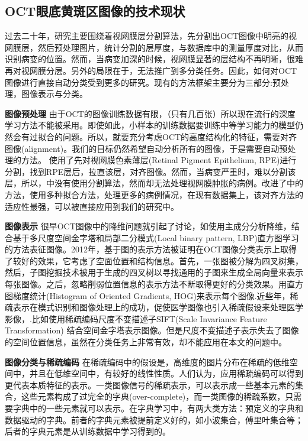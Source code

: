     \subsection{OCT眼底黄斑区图像的技术现状}
    过去二十年，研究主要围绕着视网膜层分割算法\cite{antony2013combined,savastano2014differential}，先分割出OCT图像中明亮的视网膜层，然后预处理图片，统计分割的层厚度，与数据库中的测量厚度对比，从而识别病变的位置。然而，当病变加深的时候，视网膜显著的层结构不再明晰，很难再对视网膜分层。另外的局限在于，无法推广到多分类任务。因此，如何对OCT图像进行直接自动分类受到更多的研究。现有的方法框架主要分为三部分:预处理，图像表示与分类。

    \textbf{图像预处理}
    由于OCT的图像训练数据有限，（只有几百张）所以现在流行的深度学习方法不能被采用。即使如此，小样本的训练数据要训练中等学习能力的模型仍然会有过拟合的问题。所以，就要充分考虑OCT的高度结构化的特征，需要对齐图像(alignment)。我们的目标仍然希望自动分析所有的图像，于是需要自动预处理的方法。 使用了先对视网膜色素薄层(Retinal Pigment Epithelium, RPE)进行分割，找到RPE层后，拉直该层，对齐图像。然而，当病变严重时，难以分割该层，所以，中没有使用分割算法，然而却无法处理视网膜肿胀的病例。改进了中的方法，使用多种拟合方法，处理更多的病例情况，在现有数据集上，该对齐方法的适应性最强，可以被直接应用到我们的研究中。

    \textbf{图像表示}
    很早OCT图像中的降维问题就引起了讨论，如使用主成分分析降维，结合基于多尺度空间金字塔和局部二分模式(Local binary pattern, LBP)直方图学习的方法表征图像。2012年，基于图的表示方法被证明在OCT图像分类表示上取得了较好的效果\cite{zheng2012automated,hijazi2012data}，它考虑了空面位置和结构信息。首先，一张图被分解为四叉树集，然后，子图挖掘技术被用于生成的四叉树以寻找通用的子图来生成全局向量来表示每张图像。之后，忽略削弱位置信息的表示方法不断取得更好的分类效果\cite{srinivasan2014fully}。用直方图梯度统计(Histogram of Oriented Gradients, HOG)来表示每个图像.近些年，稀疏表示在模式识别和图像处理上的成功，促使医学图像也引入稀疏假设来处理医学影像，\cite{oliveira2014medical,wang2015predict,afzali2016medical}.比如使用稀疏编码尺度不变描述子SIFT(Scale Invariance Feature Transformation) 结合空间金字塔表示图像。但是尺度不变描述子表示失去了图像的空间位置信息，虽然在分类任务上非常有效，却不能应用在本文的问题中。

    \textbf{图像分类与稀疏编码}
    在稀疏编码中的假设是，高维度的图片分布在稀疏的低维空间中，并且在低维空间中，有较好的线性性质。\cite{}人们认为，应用稀疏编码可以得到更代表本质特征的表示。一类图像信号的稀疏表示，可以表示成一些基本元素的集合，这些元素构成了过完全的字典(over-complete)，而一类图像的稀疏系数，只需要字典中的一些元素就可以表示。在字典学习中，有两大类方法：预定义的字典和数据驱动的字典。前者的字典元素被提前定义好的，如小波集合，傅里叶集合等；后者的字典元素是从训练数据中学习得到的。

